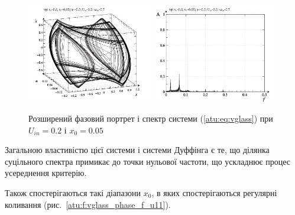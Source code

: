 \begin{figure}[ht!]
\begin{center}
  \includegraphics[width=0.49\textwidth]{p/cha/vg/vg_0-p_phe_0x20_0x70_0x05.png}
  \hfill
  \includegraphics[width=0.49\textwidth]{p/cha/vg/vg_fft-p_f_0x20_0x70_0x05.png}
\end{center}
\caption{Розширений фазовий портрет і спектр системи (\ref{atu:eq:vglass}) при $ U_{in} = 0.2 $ і $ x_0 = 0.05 $}
\label{atu:f:vglass_phase_f_u10}
\end{figure}

Загальною властивістю цієї системи і системи Дуффінга є те, що
ділянка суцільного спектра примикає до точки нульової частоти,
що ускладнює процес усереднення критерію.

Також спостерігаються такі діапазони
$ x_0 $, в яких спостерігаються регулярні коливання
(рис.~\ref{atu:f:vglass_phase_f_u11}).


